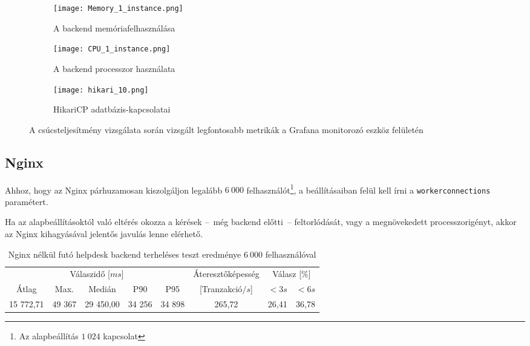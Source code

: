 \begin{figure}[hbt]
	\begin{subfigure}{.95\textwidth}
		\centering
		\texttt{[image: Memory\_1\_instance.png]}  
		\caption{A backend memóriafelhasználása}
		\label{fig:memory_1_instance}

	\end{subfigure}
	\quad

	\begin{subfigure}{.6\textwidth}
		\centering
		\texttt{[image: CPU\_1\_instance.png]}  
		\caption{A backend processzor használata}
		\label{fig:cpu_1_instance}
	\end{subfigure}

	\quad
	\begin{subfigure}{.8\textwidth}
		\centering
		\texttt{[image: hikari\_10.png]}  
		\caption{HikariCP adatbázis-kapcsolatai}
		\label{fig:10_hikari}
	\end{subfigure}
	
	\caption{A csúcsteljesítmény vizsgálata során vizsgált legfontosabb metrikák a Grafana monitorozó eszköz felületén}
	\label{fig:peak_metrics}
\end{figure}

\pagebreak

\subsection{Nginx}
Ahhoz, hogy az Nginx párhuzamosan kiszolgáljon legalább $6~000$ felhasználót\footnote{Az alapbeállítás $1~024$ kapcsolat}, a beállításaiban felül kell írni a \mbox{\texttt{worker\textunderscore connections}} paramétert.

Ha az alapbeállításoktól való eltérés okozza a kérések --~még backend előtti~--   feltorlódását, vagy a megnövekedett processzorigényt, akkor az Nginx kihagyásával jelentős javulás lenne elérhető.

\bigskip
\begin{table}[hbt]
	
	\begin{tabular}{ccccc|c|cc}
		\multicolumn{5}{c|}{Válaszidő [$ms$]}  & Áteresztőképesség & \multicolumn{2}{c}{Válasz [\%]}	\\
		Átlag & Max. & Medián & P90 & P95 &	[Tranzakció$/s$] & $<3s$& $<6s$ \\
		\hline 
		15 772,71 &  49 367 & 29 450,00 & 34 256 & 34 898 & 265,72 & 26,41 & 36,78 \\
	\end{tabular} 
	
	\caption{Nginx nélkül futó helpdesk backend terheléses teszt eredménye $6~000$ felhasználóval}
	\label{tabl:without_nginx}
\end{table}

